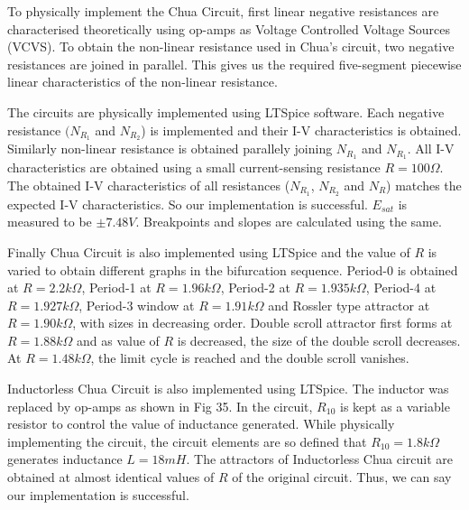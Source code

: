 \documentclass[12pt]{article}
\begin{document}
To physically implement the Chua Circuit, first linear negative resistances are characterised theoretically using op-amps as Voltage Controlled Voltage Sources (VCVS). To obtain the non-linear resistance used in Chua's circuit, two negative resistances are joined in parallel. This gives us the required five-segment piecewise linear characteristics of the non-linear resistance. \linebreak

The circuits are physically implemented using LTSpice software. Each negative resistance $(N_{R_1}$ and $N_{R_2}$) is implemented and their I-V characteristics is obtained. Similarly non-linear resistance is obtained parallely joining $N_{R_1}$ and $N_{R_1}$. All I-V characteristics are obtained using a small current-sensing resistance $R=100\Omega$. The obtained I-V characteristics of all resistances ($N_{R_1}$, $N_{R_2}$ and $N_{R}$) matches the expected I-V characteristics. So our implementation is successful. $E_{sat}$ is measured to be $\pm 7.48V$. Breakpoints and slopes are calculated using the same. \linebreak

Finally Chua Circuit is also implemented using LTSpice and the value of $R$ is varied to obtain different graphs in the bifurcation sequence. Period-0 is obtained at $R=2.2k\Omega$, Period-1 at $R=1.96k\Omega$, Period-2 at $R=1.935k\Omega$, Period-4 at $R=1.927k\Omega$, Period-3 window at $R=1.91k\Omega$ and Rossler type attractor at $R=1.90k\Omega$, with sizes in decreasing order. Double scroll attractor first forms at $R=1.88k\Omega$ and as value of $R$ is decreased, the size of the double scroll decreases. At $R=1.48k\Omega$, the limit cycle is reached and the double scroll vanishes. \linebreak

Inductorless Chua Circuit is also implemented using LTSpice. The inductor was replaced by op-amps as shown in Fig 35. In the circuit, $R_{10}$ is kept as a variable resistor to control the value of inductance generated. While physically implementing the circuit, the circuit elements are so defined that $R_{10}=1.8k\Omega$ generates inductance $L=18mH$. The attractors of Inductorless Chua circuit are obtained at almost identical values of $R$ of the original circuit. Thus, we can say our implementation is successful.


\nocite{*}


\end{document}
